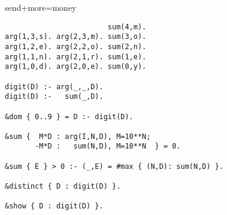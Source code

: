 \begin{frame}[fragile,shrink=1]{send+more=money}
\begin{lstlisting}
                        sum(4,m).
arg(1,3,s). arg(2,3,m). sum(3,o).
arg(1,2,e). arg(2,2,o). sum(2,n).
arg(1,1,n). arg(2,1,r). sum(1,e).
arg(1,0,d). arg(2,0,e). sum(0,y).

digit(D) :- arg(_,_,D).
digit(D) :-   sum(_,D).

&dom { 0..9 } = D :- digit(D).

&sum {  M*D : arg(I,N,D), M=10**N;
       -M*D :   sum(N,D), M=10**N  } = 0.

&sum { E } > 0 :- (_,E) = #max { (N,D): sum(N,D) }.

&distinct { D : digit(D) }.

&show { D : digit(D) }.
\end{lstlisting}
\end{frame}
%
